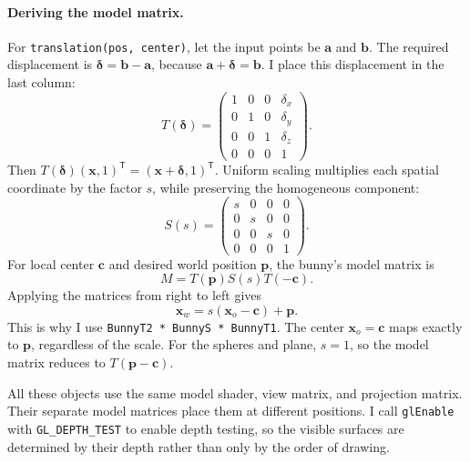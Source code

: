 \documentclass[acmtog]{acmart}
\begin{document}
\paragraph{Deriving the model matrix.}
For \texttt{translation(pos, center)}, let the input points be $\mathbf a$ and $\mathbf b$. The required displacement is $\boldsymbol\delta=\mathbf b-\mathbf a$, because $\mathbf a+\boldsymbol\delta=\mathbf b$. I place this displacement in the last column:
\begin{equation}
T(\boldsymbol\delta)=
\begin{pmatrix}
1&0&0&\delta_x\\
0&1&0&\delta_y\\
0&0&1&\delta_z\\
0&0&0&1
\end{pmatrix}.
\end{equation}
Then $T(\boldsymbol\delta)(\mathbf x,1)^{\mathsf T}=(\mathbf x+\boldsymbol\delta,1)^{\mathsf T}$. Uniform scaling multiplies each spatial coordinate by the factor $s$, while preserving the homogeneous component:
\begin{equation}
S(s)=
\begin{pmatrix}
s&0&0&0\\
0&s&0&0\\
0&0&s&0\\
0&0&0&1
\end{pmatrix}.
\end{equation}
For local center $\mathbf c$ and desired world position $\mathbf p$, the bunny's model matrix is
\begin{equation}
M=T(\mathbf p)S(s)T(-\mathbf c).
\end{equation}
Applying the matrices from right to left gives
\begin{equation}
\mathbf x_w=s(\mathbf x_o-\mathbf c)+\mathbf p.
\end{equation}
This is why I use \texttt{BunnyT2 * BunnyS * BunnyT1}. The center $\mathbf x_o=\mathbf c$ maps exactly to $\mathbf p$, regardless of the scale. For the spheres and plane, $s=1$, so the model matrix reduces to $T(\mathbf p-\mathbf c)$.

All these objects use the same model shader, view matrix, and projection matrix. Their separate model matrices place them at different positions. I call \texttt{glEnable} with \texttt{GL\_DEPTH\_TEST} to enable depth testing, so the visible surfaces are determined by their depth rather than only by the order of drawing.
\end{document}
